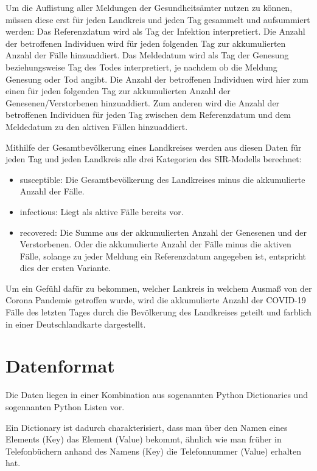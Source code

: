 Um die Auflistung aller Meldungen der Gesundheitsämter nutzen zu können, müssen diese erst für jeden Landkreis und jeden Tag gesammelt und aufsummiert werden:
Das Referenzdatum wird als Tag der Infektion interpretiert. Die Anzahl der betroffenen Individuen wird für jeden folgenden Tag zur akkumulierten Anzahl der Fälle hinzuaddiert.
Das Meldedatum wird als Tag der Genesung beziehungsweise Tag des Todes interpretiert, je nachdem ob die Meldung Genesung oder Tod angibt. Die Anzahl der betroffenen Individuen wird hier zum einen für jeden folgenden Tag zur akkumulierten Anzahl der Genesenen/Verstorbenen hinzuaddiert. Zum anderen wird die Anzahl der betroffenen Individuen für jeden Tag zwischen dem Referenzdatum und dem Meldedatum zu den aktiven Fällen hinzuaddiert.

Mithilfe der Gesamtbevölkerung eines Landkreises werden aus diesen Daten für jeden Tag und jeden Landkreis alle drei Kategorien des SIR-Modells berechnet:

\begin{itemize}
    \item \glqq{}susceptible\grqq{}: Die Gesamtbevölkerung des Landkreises minus die akkumulierte Anzahl der Fälle.
    \item \glqq{}infectious\grqq{}: Liegt als aktive Fälle bereits vor.
    \item \glqq{}recovered\grqq{}:
    Die Summe aus der akkumulierten Anzahl der Genesenen und der Verstorbenen. Oder die akkumulierte Anzahl der Fälle minus die aktiven Fälle, solange zu jeder Meldung ein Referenzdatum angegeben ist, entspricht dies der ersten Variante.
\end{itemize}

Um ein Gefühl dafür zu bekommen, welcher Lankreis in welchem Ausmaß von der Corona Pandemie getroffen wurde, wird die akkumulierte Anzahl der COVID-19 Fälle des letzten Tages durch die Bevölkerung des Landkreises geteilt und farblich in einer Deutschlandkarte dargestellt.

\section{Datenformat}
Die Daten liegen in einer Kombination aus sogenannten Python Dictionaries und sogennanten Python Listen vor.

Ein Dictionary ist dadurch charakterisiert, dass man über den Namen eines Elements (\glqq{}Key\grqq{}) das Element (\glqq{}Value\grqq{}) bekommt, ähnlich wie man früher in Telefonbüchern anhand des Namens (Key) die Telefonnummer (Value) erhalten hat.

